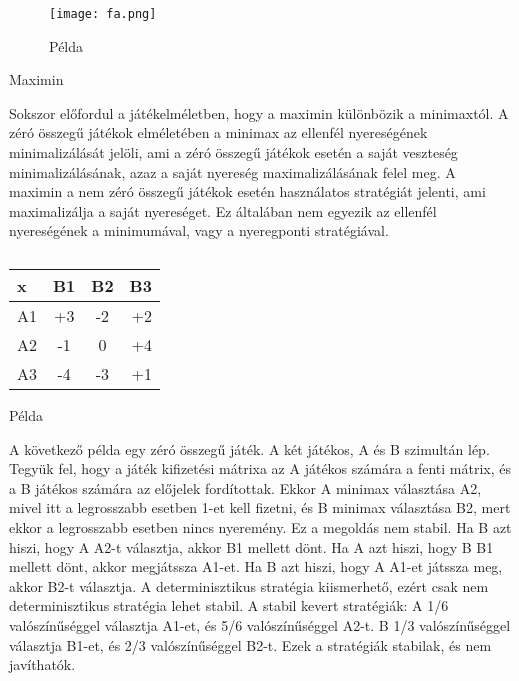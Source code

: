 \documentclass  [12pt]{article}
\begin{document}
\begin{figure}

	\centering
		\texttt{[image: fa.png]}
	\caption{Példa}
 
	\label{ref:Példa}

\end{figure}

\pagebreak


Maximin

Sokszor előfordul a játékelméletben, hogy a maximin különbözik a minimaxtól. A zéró összegű játékok elméletében a minimax az ellenfél nyereségének minimalizálását jelöli, ami a zéró összegű játékok esetén a saját veszteség minimalizálásának, azaz a saját nyereség maximalizálásának felel meg.
A maximin a nem zéró összegű játékok esetén használatos stratégiát jelenti, ami maximalizálja a saját nyereséget. Ez általában nem egyezik az ellenfél nyereségének a minimumával, vagy a nyeregponti stratégiával.


\begin{table}[b]

	\centering
	\begin{tabular}{ | l | c | c | r |}
   	\hline
       x  & B1 &  B2 & B3 \\ \hline
    A1  & +3  &  -2 &  +2 \\ \hline
    A2  & -1  &    0 &  +4 \\ \hline
    A3  & -4  &   -3 &  +1 \\

	\hline

	\end{tabular}
	\caption{}


\end{table} 





Példa

A következő példa egy zéró összegű játék. A két játékos, A és B szimultán lép.
Tegyük fel, hogy a játék kifizetési mátrixa az A játékos számára a fenti mátrix, és a B játékos számára az előjelek fordítottak. Ekkor A minimax választása A2, mivel itt a legrosszabb esetben 1-et kell fizetni, és B minimax választása B2, mert ekkor a legrosszabb esetben nincs nyeremény.
Ez a megoldás nem stabil. Ha B azt hiszi, hogy A A2-t választja, akkor B1 mellett dönt. Ha A azt hiszi, hogy B B1 mellett dönt, akkor megjátssza A1-et. Ha B azt hiszi, hogy A A1-et játssza meg, akkor B2-t választja. A determinisztikus stratégia kiismerhető, ezért csak nem determinisztikus stratégia lehet stabil.
A stabil kevert stratégiák: A 1/6 valószínűséggel választja A1-et, és 5/6 valószínűséggel A2-t. B 1/3 valószínűséggel választja B1-et, és 2/3 valószínűséggel B2-t. Ezek a stratégiák stabilak, és nem javíthatók.
\end{document}
